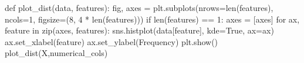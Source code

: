 \documentclass[
  11pt,
  letterpaper,
  DIV=11,
  numbers=noendperiod]{scrartcl}
\newenvironment{Shaded}{\begin{snugshade}}{\end{snugshade}}
\newcommand{\BuiltInTok}[1]{\textcolor[rgb]{0.00,0.23,0.31}{#1}}
\newcommand{\ControlFlowTok}[1]{\textcolor[rgb]{0.00,0.23,0.31}{#1}}
\newcommand{\DecValTok}[1]{\textcolor[rgb]{0.68,0.00,0.00}{#1}}
\newcommand{\KeywordTok}[1]{\textcolor[rgb]{0.00,0.23,0.31}{#1}}
\newcommand{\NormalTok}[1]{\textcolor[rgb]{0.00,0.23,0.31}{#1}}
\newcommand{\OperatorTok}[1]{\textcolor[rgb]{0.37,0.37,0.37}{#1}}
\newcommand{\StringTok}[1]{\textcolor[rgb]{0.13,0.47,0.30}{#1}}
\newcommand{\VariableTok}[1]{\textcolor[rgb]{0.07,0.07,0.07}{#1}}
\begin{document}
\begin{Shaded}
\begin{Highlighting}[]
\KeywordTok{def}\NormalTok{ plot\_dist(data, features):}
\NormalTok{    fig, axes }\OperatorTok{=}\NormalTok{ plt.subplots(nrows}\OperatorTok{=}\BuiltInTok{len}\NormalTok{(features), ncols}\OperatorTok{=}\DecValTok{1}\NormalTok{, figsize}\OperatorTok{=}\NormalTok{(}\DecValTok{8}\NormalTok{, }\DecValTok{4} \OperatorTok{*} \BuiltInTok{len}\NormalTok{(features)))}
    \ControlFlowTok{if} \BuiltInTok{len}\NormalTok{(features) }\OperatorTok{==} \DecValTok{1}\NormalTok{:}
\NormalTok{        axes }\OperatorTok{=}\NormalTok{ [axes]}
    \ControlFlowTok{for}\NormalTok{ ax, feature }\KeywordTok{in} \BuiltInTok{zip}\NormalTok{(axes, features):}
\NormalTok{        sns.histplot(data[feature], kde}\OperatorTok{=}\VariableTok{True}\NormalTok{, ax}\OperatorTok{=}\NormalTok{ax)}
\NormalTok{    ax.set\_xlabel(feature)}
\NormalTok{    ax.set\_ylabel(}\StringTok{\textquotesingle{}Frequency\textquotesingle{}}\NormalTok{)}
\NormalTok{plt.show()}
\NormalTok{plot\_dist(X,numerical\_cols)}
\end{Highlighting}
\end{Shaded}
\end{document}
